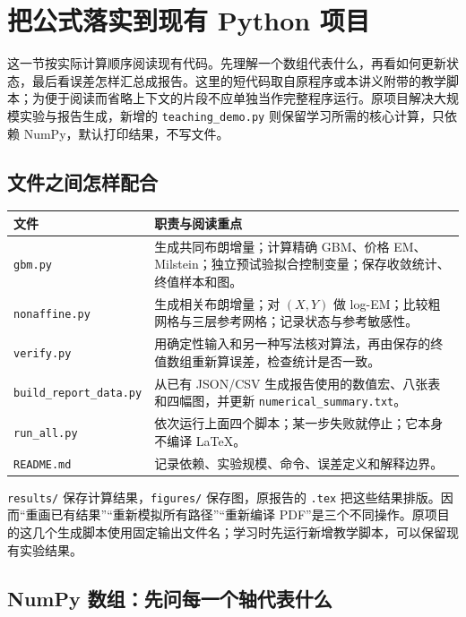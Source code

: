 \section{把公式落实到现有 Python 项目}
\label{code:chapter}

这一节按实际计算顺序阅读现有代码。先理解一个数组代表什么，再看如何更新状态，最后看误差怎样汇总成报告。这里的短代码取自原程序或本讲义附带的教学脚本；为便于阅读而省略上下文的片段不应单独当作完整程序运行。原项目解决大规模实验与报告生成，新增的 \texttt{teaching\_demo.py} 则保留学习所需的核心计算，只依赖 NumPy，默认打印结果，不写文件。

\subsection{文件之间怎样配合}

\begin{center}
\small
\begin{tabularx}{\textwidth}{@{}lY@{}}
\toprule
文件 & 职责与阅读重点\\
\midrule
\texttt{gbm.py} & 生成共同布朗增量；计算精确 GBM、价格 EM、Milstein；独立预试验拟合控制变量；保存收敛统计、终值样本和图。\\
\texttt{nonaffine.py} & 生成相关布朗增量；对 $(X,Y)$ 做 log-EM；比较粗网格与三层参考网格；记录状态与参考敏感性。\\
\texttt{verify.py} & 用确定性输入和另一种写法核对算法，再由保存的终值数组重新算误差，检查统计是否一致。\\
\texttt{build\_report\_data.py} & 从已有 JSON/CSV 生成报告使用的数值宏、八张表和四幅图，并更新 \texttt{numerical\_summary.txt}。\\
\texttt{run\_all.py} & 依次运行上面四个脚本；某一步失败就停止；它本身不编译 \LaTeX。\\
\texttt{README.md} & 记录依赖、实验规模、命令、误差定义和解释边界。\\
\bottomrule
\end{tabularx}
\end{center}

\texttt{results/} 保存计算结果，\texttt{figures/} 保存图，原报告的 \texttt{.tex} 把这些结果排版。因而“重画已有结果”“重新模拟所有路径”“重新编译 PDF”是三个不同操作。原项目的这几个生成脚本使用固定输出文件名；学习时先运行新增教学脚本，可以保留现有实验结果。

\subsection{NumPy 数组：先问每一个轴代表什么}

